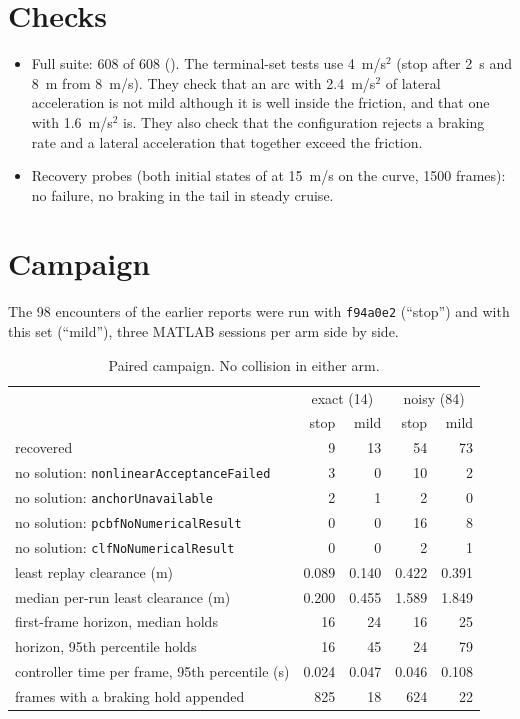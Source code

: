 \documentclass[11pt]{article}
\begin{document}
\section{Checks}
\begin{itemize}
\item Full suite: 608 of 608 (). The terminal-set tests use
  4~m/s$^2$ (stop after 2~s and 8~m from 8~m/s). They check that an arc with
  2.4~m/s$^2$ of lateral acceleration is not mild although it is well
  inside the friction, and that one with 1.6~m/s$^2$ is. They also check
  that the configuration rejects a braking rate and a lateral acceleration
  that together exceed the friction.
\item Recovery probes (both initial states of
   at 15~m/s on the curve, 1500 frames): no
  failure, no braking in the tail in steady cruise.
\end{itemize}

\section{Campaign}
The 98 encounters of the earlier reports were run with \texttt{f94a0e2}
(``stop'') and with this set (``mild''), three MATLAB sessions per arm side by
side.

\begin{table}[h]
\centering\small
\caption{Paired campaign. No collision in either arm.}
\begin{tabular}{lrrrr}
\toprule
 & \multicolumn{2}{c}{exact (14)} & \multicolumn{2}{c}{noisy (84)}\\
 & stop & mild & stop & mild\\
\midrule
recovered & 9 & 13 & 54 & 73\\
no solution: \texttt{nonlinearAcceptanceFailed} & 3 & 0 & 10 & 2\\
no solution: \texttt{anchorUnavailable} & 2 & 1 & 2 & 0\\
no solution: \texttt{pcbfNoNumericalResult} & 0 & 0 & 16 & 8\\
no solution: \texttt{clfNoNumericalResult} & 0 & 0 & 2 & 1\\
least replay clearance (m) & 0.089 & 0.140 & 0.422 & 0.391\\
median per-run least clearance (m) & 0.200 & 0.455 & 1.589 & 1.849\\
first-frame horizon, median holds & 16 & 24 & 16 & 25\\
horizon, 95th percentile holds & 16 & 45 & 24 & 79\\
controller time per frame, 95th percentile (s) & 0.024 & 0.047 & 0.046 & 0.108\\
frames with a braking hold appended & 825 & 18 & 624 & 22\\
\bottomrule
\end{tabular}
\end{table}
\end{document}
